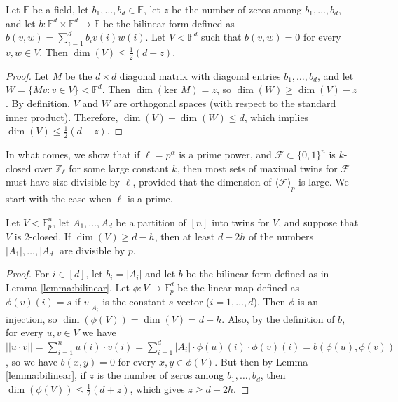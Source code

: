 	\begin{lemma}\label{lemma:bilinear}
		Let $\mathbb{F}$ be a field, let $b_1,\dots,b_d\in \mathbb{F}$, let $z$ be the number of zeros among $b_1,\dots,b_d$, and let $b:\mathbb{F}^{d}\times\mathbb{F}^{d}\rightarrow \mathbb{F}$ be the bilinear form defined as $b(v,w)=\sum_{i=1}^{d}b_i v(i)w(i)$. Let $V<\mathbb{F}^{d}$ such that $b(v,w)=0$ for every $v,w\in V$. Then $\dim(V)\leq \frac{1}{2}(d+z)$.
	\end{lemma}
	
	\begin{proof}
		Let $M$ be the $d\times d$ diagonal matrix with diagonal entries $b_{1},\dots,b_{d}$, and let $W=\{Mv:v\in V\}<\mathbb{F}^{d}$. Then $\dim(\mbox{ker }M)=z$, so $\dim(W)\geq\dim(V)-z$. 
		By definition, $V$ and $W$ are orthogonal spaces (with respect to the standard inner product). Therefore, $\dim(V)+\dim(W)\leq d$, which implies $\dim(V)\leq \frac{1}{2}(d+z)$.
	\end{proof}
	
	In what comes, we show that if $\ell=p^{\alpha}$ is a prime power, and  $\mathcal{F}\subset \{0,1\}^n$ is $k$-closed over $\mathbb{Z}_{\ell}$ for some large constant $k$, then most sets of maximal twins for $\mathcal{F}$ must have size divisible by $\ell$, provided that the dimension of $\langle \mathcal{F}\rangle_p$ is large. We start with the case when $\ell$ is a prime.
	
	\begin{lemma}\label{lemma:prime}
		Let $V<\mathbb{F}_p^{n}$, let $A_1,\dots,A_d$ be a partition of $[n]$ into twins for $V$, and suppose that $V$ is 2-closed. If $\dim(V) \geq d-h$, then at least $d-2h$ of the numbers $|A_1|,\dots,|A_{d}|$ are divisible by $p$.
	\end{lemma}
	
	\begin{proof}
		For $i\in [d]$, let $b_i=|A_i|$ and let $b$ be the bilinear form defined as in Lemma \ref{lemma:bilinear}. Let $\phi:V\rightarrow\mathbb{F}_p^{d}$ be the linear map defined as $\phi(v)(i)=s$ if $v|_{A_i}$ is the constant $s$ vector ($i = 1,\dots,d$). Then $\phi$ is an injection, so $\dim(\phi(V))=\dim(V)=d-h$. Also, by the definition of $b$, for every $u,v\in V$ we have $||u\cdot v||= \sum_{i = 1}^n{u(i) \cdot v(i)} = \sum_{i=1}^d{|A_i| \cdot \phi(u)(i) \cdot \phi(v)(i)} =  b(\phi(u),\phi(v))$, so we have $b(x,y)=0$ for every $x,y\in\phi(V)$. But then by Lemma \ref{lemma:bilinear}, if $z$ is the number of zeros among $b_1,\dots,b_d$, then $\dim(\phi(V))\leq \frac{1}{2}(d+z)$, which gives $z\geq d-2h$.
	\end{proof}
	
